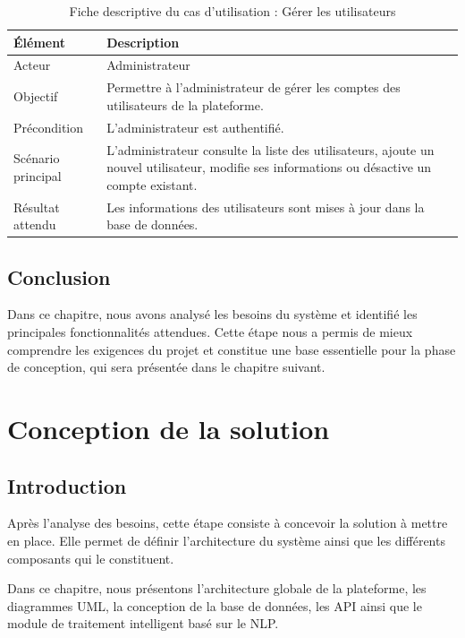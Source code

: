 \documentclass[12pt,a4paper,oneside]{report}
\begin{document}
\begin{table}[H]
\centering
\small
\caption{Fiche descriptive du cas d’utilisation : Gérer les utilisateurs}
\begin{tabular}{|p{4cm}|p{9cm}|}
\hline
\textbf{Élément} & \textbf{Description} \\
\hline
Acteur & Administrateur \\
\hline
Objectif & Permettre à l’administrateur de gérer les comptes des utilisateurs de la plateforme. \\
\hline
Précondition & L’administrateur est authentifié. \\
\hline
Scénario principal & L’administrateur consulte la liste des utilisateurs, ajoute un nouvel utilisateur, modifie ses informations ou désactive un compte existant. \\
\hline
Résultat attendu & Les informations des utilisateurs sont mises à jour dans la base de données. \\
\hline
\end{tabular}
\end{table}

\section{Conclusion}

Dans ce chapitre, nous avons analysé les besoins du système et identifié les principales fonctionnalités attendues. Cette étape nous a permis de mieux comprendre les exigences du projet et constitue une base essentielle pour la phase de conception, qui sera présentée dans le chapitre suivant.
\chapter{Conception de la solution}

\section{Introduction}

Après l’analyse des besoins, cette étape consiste à concevoir la solution à mettre en place. Elle permet de définir l’architecture du système ainsi que les différents composants qui le constituent.

Dans ce chapitre, nous présentons l’architecture globale de la plateforme, les diagrammes UML, la conception de la base de données, les API ainsi que le module de traitement intelligent basé sur le NLP.
\end{document}
